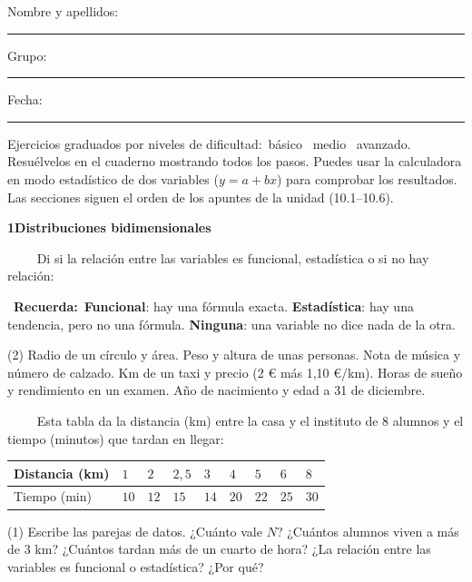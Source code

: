 \documentclass[11pt,a4paper]{article}
\newcommand{\estrelles}[1]{{\color{accent}\ifcase#1\or\faStar\faStar[regular]\faStar[regular]\or\faStar\faStar\faStar[regular]\or\faStar\faStar\faStar\fi}}
\newcounter{exer}
\newcommand{\ex}[1]{\par\needspace{4\baselineskip}\medskip\stepcounter{exer}\noindent{\color{navy}\bfseries\theexer.}\ \ {\small\estrelles{#1}}\ \ }
\newcommand{\seccio}[2]{\par\needspace{10\baselineskip}\bigskip
  \begin{tcolorbox}[colback=navy,colframe=navy,coltext=white,arc=2mm,boxrule=0pt,left=3mm,right=3mm,top=1.2mm,bottom=1.2mm]
  {\large\bfseries #1\quad #2}
  \end{tcolorbox}\vspace{-2pt}}
\newcommand{\recorda}[1]{\par\smallskip\begin{tcolorbox}[colback=accent!7,colframe=accent!55,arc=2mm,boxrule=0.5pt,left=2.5mm,right=2.5mm,top=1mm,bottom=1mm]\small{\color{accent}\faLightbulb[regular]}\ \textbf{Recuerda:}\ #1\end{tcolorbox}}
\begin{document}
\thispagestyle{primera}

\vspace{10pt}
Nombre y apellidos: \rule{6.6cm}{0.4pt}\hfill Grupo: \rule{1.6cm}{0.4pt}\hfill Fecha: \rule{2.2cm}{0.4pt}
\vspace{8pt}

\begin{tcolorbox}[colback=soft,colframe=soft,arc=2mm,left=3mm,right=3mm,top=1.5mm,bottom=1.5mm]
\small Ejercicios graduados por niveles de dificultad:\quad \estrelles{1}\ básico \qquad \estrelles{2}\ medio \qquad \estrelles{3}\ avanzado.\\[2pt] Resuélvelos en el cuaderno mostrando todos los pasos. Puedes usar la calculadora en modo estadístico de dos variables ($y=a+bx$) para comprobar los resultados. Las secciones siguen el orden de los apuntes de la unidad (10.1--10.6).
\end{tcolorbox}

\seccio{1}{Distribuciones bidimensionales}

\ex{1} Di si la relación entre las variables es funcional, estadística o si no hay relación:\recorda{\textbf{Funcional}: hay una fórmula exacta. \textbf{Estadística}: hay una tendencia, pero no una fórmula. \textbf{Ninguna}: una variable no dice nada de la otra.}\begin{tasks}(2)
  \task Radio de un círculo y área.
  \task Peso y altura de unas personas.
  \task Nota de música y número de calzado.
  \task Km de un taxi y precio (2 € más 1,10 €/km).
  \task Horas de sueño y rendimiento en un examen.
  \task Año de nacimiento y edad a 31 de diciembre.
\end{tasks}

\ex{1} Esta tabla da la distancia (km) entre la casa y el instituto de 8 alumnos y el tiempo (minutos) que tardan en llegar:\par\smallskip\begin{center}{\renewcommand{\arraystretch}{1.3}\begin{tabular}{|l|C{0.8cm}|C{0.8cm}|C{0.8cm}|C{0.8cm}|C{0.8cm}|C{0.8cm}|C{0.8cm}|C{0.8cm}|}\hline Distancia (km) & $1$ & $2$ & $2{,}5$ & $3$ & $4$ & $5$ & $6$ & $8$\\\hline Tiempo (min) & $10$ & $12$ & $15$ & $14$ & $20$ & $22$ & $25$ & $30$\\\hline\end{tabular}}\end{center}\begin{tasks}(1)
  \task Escribe las parejas de datos. ¿Cuánto vale $N$?
  \task ¿Cuántos alumnos viven a más de 3 km? ¿Cuántos tardan más de un cuarto de hora?
  \task ¿La relación entre las variables es funcional o estadística? ¿Por qué?
\end{tasks}
\end{document}
